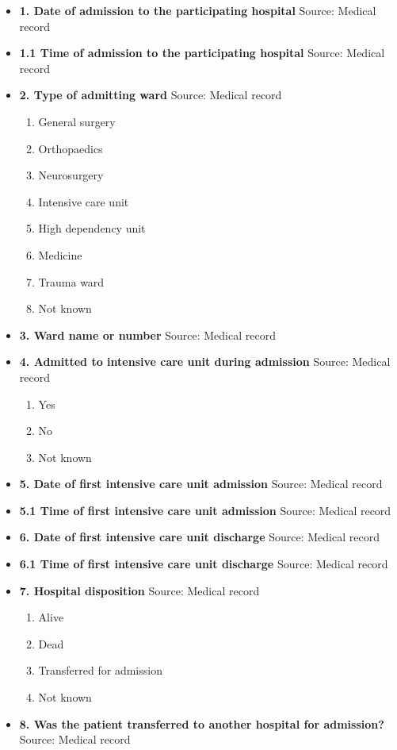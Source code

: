 \documentclass[
]{scrartcl}
\providecommand{\tightlist}{%
  \setlength{\itemsep}{0pt}\setlength{\parskip}{0pt}}\usepackage{longtable,booktabs,array}
\begin{document}
\begin{itemize}
\item
  \textbf{1. Date of admission to the participating hospital} Source:
  Medical record
\item
  \textbf{1.1 Time of admission to the participating hospital} Source:
  Medical record
\item
  \textbf{2. Type of admitting ward} Source: Medical record

  \begin{enumerate}
  \def\labelenumi{\arabic{enumi}.}
  \tightlist
  \item
    General surgery
  \item
    Orthopaedics
  \item
    Neurosurgery
  \item
    Intensive care unit
  \item
    High dependency unit
  \item
    Medicine
  \item
    Trauma ward
  \item
    Not known
  \end{enumerate}
\item
  \textbf{3. Ward name or number} Source: Medical record
\item
  \textbf{4. Admitted to intensive care unit during admission} Source:
  Medical record

  \begin{enumerate}
  \def\labelenumi{\arabic{enumi}.}
  \tightlist
  \item
    Yes
  \item
    No
  \item
    Not known
  \end{enumerate}
\item
  \textbf{5. Date of first intensive care unit admission} Source:
  Medical record
\item
  \textbf{5.1 Time of first intensive care unit admission} Source:
  Medical record
\item
  \textbf{6. Date of first intensive care unit discharge} Source:
  Medical record
\item
  \textbf{6.1 Time of first intensive care unit discharge} Source:
  Medical record
\item
  \textbf{7. Hospital disposition} Source: Medical record

  \begin{enumerate}
  \def\labelenumi{\arabic{enumi}.}
  \tightlist
  \item
    Alive
  \item
    Dead
  \item
    Transferred for admission
  \item
    Not known
  \end{enumerate}
\item
  \textbf{8. Was the patient transferred to another hospital for
  admission?} Source: Medical record


\end{itemize}
\end{document}
